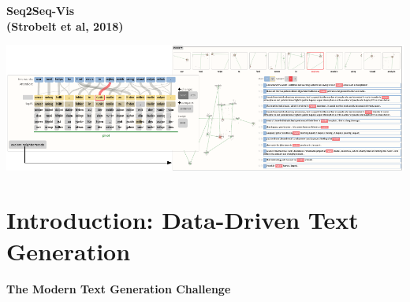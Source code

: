 \documentclass[aspectratio=169]{beamer}
\begin{document}
\begin{frame}
  \begin{center}
    \textbf{Seq2Seq-Vis \\ {\small (Strobelt et al, 2018)} }
  \end{center}

  \includegraphics[width=\textwidth]{s2stease}
\end{frame}


\section{Introduction: Data-Driven Text Generation}

\begin{frame}
  \begin{center}
    \textbf{The Modern Text Generation Challenge}
  \end{center}
  \begin{center}
  \end{center}
\end{frame}

\end{document}

